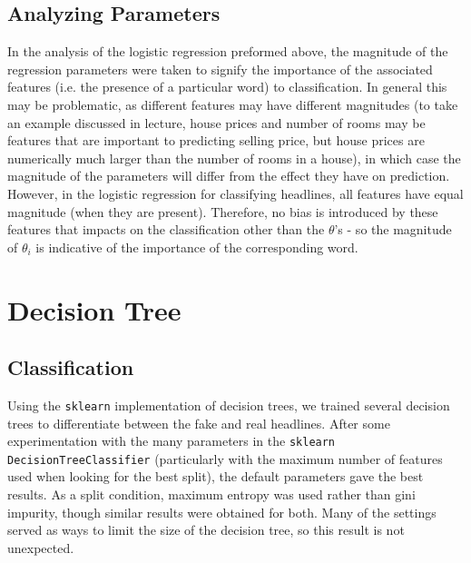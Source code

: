 \documentclass{article}
\begin{document}
   \subsection{Analyzing Parameters}
   In the analysis of the logistic regression preformed above, the magnitude of the regression parameters
   were taken to signify the importance of the associated features (i.e. the presence of a particular word)
   to classification. In general this may be problematic, as different features may have different
   magnitudes (to take an example discussed in lecture, house prices and number of rooms may be features that
   are important to predicting selling price, but house prices are numerically much larger than the number of
   rooms in a house), in which case the magnitude of the parameters will differ from the effect they have on
   prediction.
   However, in the logistic regression for classifying headlines, all features have equal magnitude (when
   they are present). Therefore, no bias is introduced by these features that impacts on the classification
   other than the $\theta$'s - so the magnitude of $\theta_i$ is indicative of the importance of the
   corresponding word. 



   \section{Decision Tree}
   \subsection{Classification}
   Using the \texttt{sklearn} implementation of decision trees, we trained several decision trees
   to differentiate between the fake and real headlines. After some experimentation with the many parameters
   in the \texttt{sklearn DecisionTreeClassifier} (particularly with the maximum number of features used
   when looking for the best split), the default parameters gave the best results. As a split condition,
   maximum entropy was used rather than gini impurity, though similar results were obtained for both.
   Many of the settings served as ways to limit the size of the decision tree, so this result is not unexpected.
\end{document}
